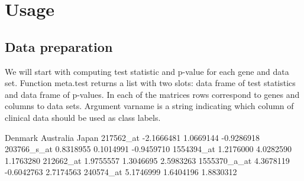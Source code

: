 \documentclass[a4paper]{report}
\begin{document}
\section*{Usage}
\subsection*{Data preparation}
We will start with computing test statistic and p-value for each gene and data set. Function {\ttfamily meta.test} returns a list with two slots: data frame of test statistics and data frame of p-values. In each of the matrices rows correspond to genes and columns to data sets. Argument {\ttfamily varname} is a string indicating which column of clinical data should be used as class labels. 
\begin{Schunk}
\begin{Soutput}
                Denmark  Australia      Japan
217562_at    -2.1666481  1.0669144 -0.9286918
203766_s_at   0.8318955  0.1014991 -0.9459710
1554394_at    1.2176000  4.0282590  1.1763280
212662_at     1.9755557  1.3046695  2.5983263
1555370_a_at  4.3678119 -0.6042763  2.7174563
240574_at     5.1746999  1.6404196  1.8830312
\end{Soutput}
\end{Schunk}
\end{document}
